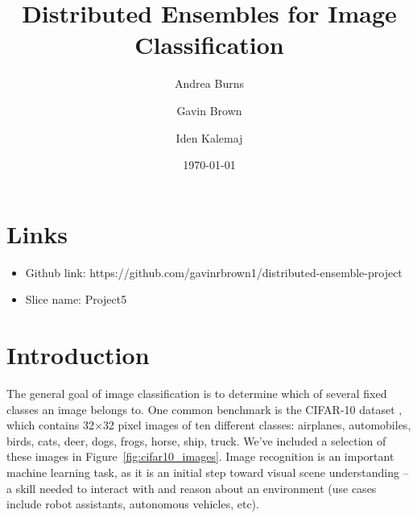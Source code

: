 \documentclass[12pt]{article}
\title{Distributed Ensembles for Image Classification}
\author{Andrea Burns \and Gavin Brown \and Iden Kalemaj}
\date{\today}
\begin{document}
\maketitle
\section{Links}
\begin{itemize}
	\item Github link: https://github.com/gavinrbrown1/distributed-ensemble-project
	\item Slice name: Project5
\end{itemize}

\section{Introduction}

The general goal of image classification is to determine which of several fixed classes an image belongs to. 
One common benchmark is the CIFAR-10 dataset \cite{cifar10}, which contains 32$\times$32 pixel images of ten different classes: airplanes, automobiles, birds, cats, deer, dogs, frogs, horse, ship, truck.
We've included a selection of these images in Figure~\ref{fig:cifar10_images}.
Image recognition is an important machine learning task, as it is an initial step toward visual scene understanding -- a skill needed to interact with and reason about an environment (use cases include robot assistants, autonomous vehicles, etc).
\end{document}
